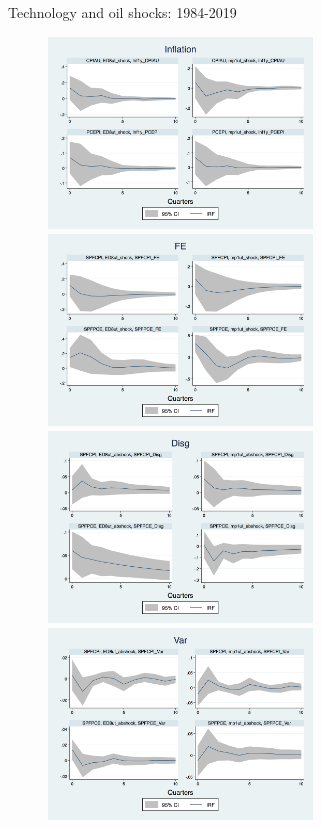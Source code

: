 \documentclass{beamer}
\begin{document}
\begin{frame}{Technology and oil shocks: 1984-2019}

\begin{figure}
	\includegraphics[width=7cm]{figuresDraft/Inf_ashocks.png} 
	\smallskip
	\includegraphics[width=7cm]{figuresDraft/SPFFE_ashocks.png} \\
	\smallskip
	\includegraphics[width=7cm]{figuresDraft/SPFDisg_ab_ashocks.png} 
	\smallskip
	\includegraphics[width=7cm]{figuresDraft/SPFVar_ab_ashocks.png}  
\end{figure}

\end{frame}
\end{document}
